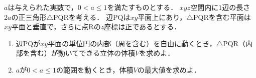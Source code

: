 \documentclass[../../main.tex]{subfiles}
\begin{document}
$a$は与えられた実数で，$0<a\le 1$を満たすものとする．
$xyz$空間内に$1$辺の長さ$2a$の正三角形$\triangle \mathrm{PQR}$を考える．
辺$\mathrm{PQ}$は$xy$平面上にあり，$\triangle\mathrm{PQR}$を含む平面は$xy$平面と垂直で，さらに点$\mathrm{R}$の$z$座標は正であるとする．
\begin{enumerate}
  \item 辺$\mathrm{PQ}$が$xy$平面の単位円の内部（周を含む）を自由に動くとき，$\triangle\mathrm{PQR}$（内部を含む）が動いてできる立体の体積$V$を求めよ．
  \item $a$が$0<a\le 1$の範囲を動くとき，体積$V$の最大値を求めよ．
\end{enumerate}
\end{document}
